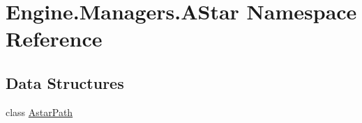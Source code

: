 \hypertarget{a00241}{}\section{Engine.\+Managers.\+A\+Star Namespace Reference}
\label{a00241}
\subsection*{Data Structures}
\begin{DoxyCompactItemize}
\item 
class \hyperlink{a00310}{Astar\+Path}
\end{DoxyCompactItemize}
